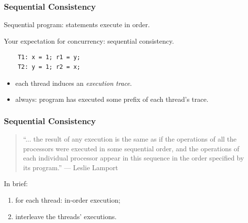 \begin{frame}[fragile]
\frametitle{Sequential Consistency}

 
  Sequential program: statements execute in order.

  Your expectation for concurrency: sequential consistency.
  
\begin{center}
\begin{lstlisting}
    T1: x = 1; r1 = y;
    T2: y = 1; r2 = x;
\end{lstlisting}
\end{center}


    \begin{itemize}
      \item each thread induces an \emph{execution trace}.
      \item always: program has executed some prefix of each thread's
        trace.
    \end{itemize}
  
\end{frame}
  
\begin{frame}
\frametitle{Sequential Consistency}


\begin{quote}
``... the result of any execution is the same as if the operations of all the processors were executed in some sequential order, and the operations of each individual processor appear in this sequence in the order specified by its program.'' --- Leslie Lamport
\end{quote}
  In brief:
  \begin{enumerate}
  \item for each thread: in-order execution;
  \item interleave the threads' executions.
  \end{enumerate}~\\


\end{frame}





